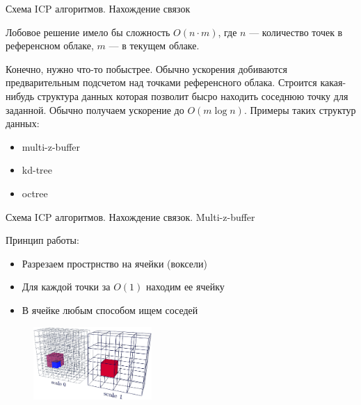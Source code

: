 \documentclass[6pt,pdf,utf8,russian]{beamer}
\begin{document}
\begin{frame}[fragile]{Схема ICP алгоритмов. Нахождение связок}

    \begin{block}{}
        Лобовое решение имело бы сложность $O(n\cdot m)$, где $n$ --- количество точек в референсном облаке, $m$ --- в текущем облаке.
    \end{block}

    \pause

    \begin{block}{}
        Конечно, нужно что-то побыстрее. Обычно ускорения добиваются предварительным подсчетом над точками референсного облака.
        Строится какая-нибудь структура данных которая позволит бысро находить соседнюю точку для заданной. Обычно получаем
        ускорение до $O(m \log n)$.
        Примеры таких структур данных:
        \begin{itemize}
            \item multi-z-buffer
            \item kd-tree
            \item octree
        \end{itemize}
    \end{block}

\end{frame}

\begin{frame}[fragile]{Схема ICP алгоритмов. Нахождение связок. Multi-z-buffer}

    \begin{block}{}
        Принцип работы:
        \begin{itemize}
            \item Разрезаем прострнство на ячейки (воксели)
            \item Для каждой точки за $O(1)$ находим ее ячейку
            \item В ячейке любым способом ищем соседей
        \end{itemize}
    \end{block}

    \pause

    \begin{block}{}
        \begin{figure}
            \includegraphics[width=0.4\textwidth]{images/multi_z_buffer.png}
        \end{figure}
    \end{block}

\end{frame}
\end{document}
